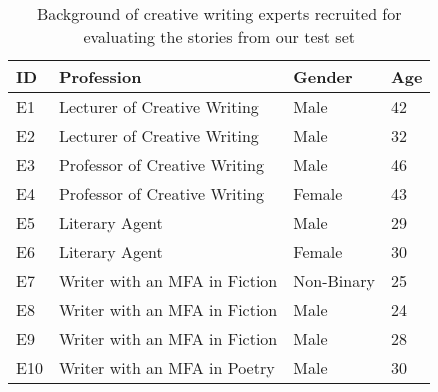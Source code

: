 \begin{table}[!ht]
\centering
\small
\begin{tabular}{|l|l|l|l|}
\hline
ID & Profession  & Gender & Age                \\ \hline
E1 & Lecturer of Creative Writing & Male & 42 \\ \hline
E2 & Lecturer of Creative Writing & Male & 32 \\ \hline
E3 & Professor of Creative Writing & Male & 46  \\ \hline
E4 & Professor of Creative Writing & Female & 43 \\ \hline
E5 & Literary Agent & Male & 29 \\ \hline
E6 & Literary Agent & Female & 30  \\ \hline
E7 & Writer with an MFA in Fiction & Non-Binary &  25       \\ \hline
E8 & Writer with an MFA in Fiction & Male & 24      \\ \hline
E9 & Writer with an MFA in Fiction & Male & 28      \\ \hline
E10 & Writer with an MFA in Poetry  & Male & 30                      \\ \hline
\end{tabular}
\vspace{2ex}
\caption{\label{creativeexperts}Background of creative writing experts recruited for evaluating the stories from our test set}
\vspace{-3ex}
\end{table}

